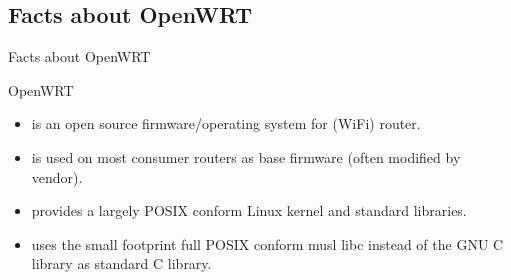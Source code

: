 ﻿\subsection{Facts about OpenWRT}

\begin{frame}{Facts about OpenWRT}
\begin{center}
\LARGE {\color{fh-ooe-red}OpenWRT}
\href{https://openwrt.org/}{}
\end{center}

\begin{itemize}
  \item is an \alert{open source firmware/operating system} for (WiFi) \alert{router}.
  \item is used on \alert{most consumer routers} as base firmware (often modified by vendor).
  \item provides a largely \alert{POSIX} \href{https://en.wikipedia.org/wiki/POSIX}{} conform Linux kernel and standard libraries.
  \item uses the small footprint full POSIX conform \alert{musl libc} \href{https://musl.libc.org/}{} instead of the \alert{GNU C library} \href{https://www.gnu.org/software/libc/}{} as standard C library.
\end{itemize}
\end{frame}
